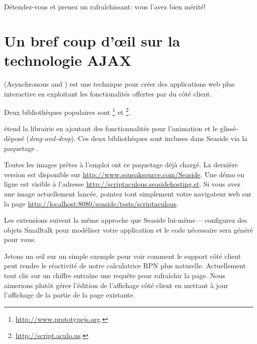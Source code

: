 \documentclass[a4paper,10pt,twoside]{book}
\begin{document}

Détendez-vous et prenez un rafraîchissant: vous l'avez bien mérité!


\section{Un bref coup d'\oe il sur la technologie AJAX}


 (Asynchronous  and ) est une
technique pour créer des applications web plus interactive en
exploitant les fonctionalités offertes par \jscript du côté client.

Deux bibliothèques \jscript{} populaires sont \ind{\pjs}\footnote{\url{http://www.prototypejs.org}.} et \ind{\sau}\footnote{\url{http://script.aculo.us}.}.


\sau{} étend la librairie \pjs{} en ajoutant des fonctionnalités pour
l'animation et le glissé-déposé (\emph{drag-and-drop}).
Ces deux bibliothèques sont incluses dans Seaside via la paquetage
.

Toutes les images prêtes à l'emploi ont ce paquetage déjà chargé. La
dernière version est disponible sur
\url{http://www.squeaksource.com/Seaside}.
Une démo en ligne est visible à l'adresse 
\url{http://scriptaculous.seasidehosting.st}.
Si vous avez une image actuellement lancée, pointez tout simplement
votre navigateur web sur la page
\url{http://localhost:8080/seaside/tests/scriptaculous}.

Les extensions \sau{} suivent la même approche que Seaside
lui-même\,---\,configurez des objets Smalltalk pour modéliser votre
application et le code \jscript{} nécessaire sera généré pour vous.

Jetons un \oe il sur un simple exemple pour voir comment le support
\jscript{} côté client peut rendre le réactivité de notre calculatrice
RPN plus naturelle.
Actuellement tout clic sur un chiffre entraîne une requête pour
rafraîchir la page. Nous aimerions plutôt gérer l'édition de
l'affichage côté client en mettant à jour l'affichage 
de la partie  de la page existante.
\end{document}
